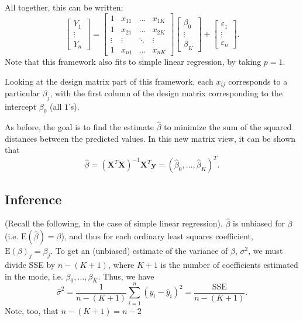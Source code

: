 \documentclass[12pt]{article}
\begin{document}
All together, this can be written; \[\begin{bmatrix}
    Y_1\\
    \vdots\\
    Y_n
\end{bmatrix} = \begin{bmatrix}
    1 & x_{11} & \dots & x_{1K}\\
    1  & x_{21} & \dots & x_{2K}\\
    \vdots & \vdots & \ddots & \vdots\\
    1 & x_{n1} & \dots & x_{nK}
\end{bmatrix} \begin{bmatrix}
    \beta_0\\
    \vdots\\
    \beta_K
\end{bmatrix} + \begin{bmatrix}
    \varepsilon_1\\
    \vdots\\
    \varepsilon_n
\end{bmatrix}.\] Note that this framework also fits to simple linear regression, by taking $p=1$. 

Looking at the design matrix part of this framework, each $x_{ij}$ corresponds to a particular $\beta_j$, with the first column of the design matrix corresponding to the intercept $\beta_0$ (all $1$'s).

As before, the goal is to find the estimate $\hat{\beta}$ to minimize the sum of the squared distances between the predicted values. In this new matrix view, it can be shown that \[\hat{\beta} = (\mathbf{X}^T\mathbf{X})^{-1}\mathbf{X}^T\mathbf{y} = (\hat{\beta}_0, \dots, \hat{\beta}_K)^T.\]

\subsection{Inference}

(Recall the following, in the case of simple linear regression). $\hat{\beta}$ is unbiased for $\beta$ (i.e. $\text{E}(\hat{\beta}) = \beta$), and thus for each ordinary least squares coefficient, $\text{E}(\beta)_j = \beta_j$. To get an (unbiased) estimate of the variance of $\beta$, $\sigma^2$, we must divide SSE by $n - (K + 1)$, where $K + 1$ is the number of coefficients estimated in the mode, i.e. $\beta_0, \dots, \beta_K$. Thus, we have \[\hat{\sigma}^2 = \frac{1}{n- (K+1)} \sum_{i=1}^n(y_i - \hat{y}_i)^2 = \frac{\text{SSE}}{n - (K + 1)}.\] Note, too, that $n - (K + 1) = n - 2$ 
\end{document}
